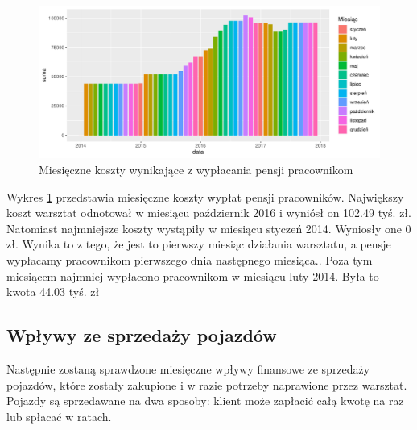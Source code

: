 \documentclass{article}\usepackage[]{graphicx}\usepackage[]{xcolor}
\makeatletter
\def\maxwidth{ %
  \ifdim\Gin@nat@width>\linewidth
    \linewidth
  \else
    \Gin@nat@width
  \fi
}
\newenvironment{knitrout}{}{} %
\makeatother
\begin{document}
\begin{knitrout}
\color{fgcolor}\begin{figure}[H]

{\centering \includegraphics[width=\maxwidth]{figure/fig_pracownicy-1} 

}

\caption[Miesięczne koszty wynikające z wypłacania pensji pracownikom]{Miesięczne koszty wynikające z wypłacania pensji pracownikom}\label{fig:fig_pracownicy}
\end{figure}

\end{knitrout}

Wykres \ref{fig:fig_pracownicy} przedstawia miesięczne koszty wypłat pensji pracowników. Największy koszt warsztat odnotował w miesiącu październik 2016 i wyniósł on 102.49 tyś. zł. 
Natomiast najmniejsze koszty wystąpiły w miesiącu styczeń 2014. Wyniosły one 0 zł. Wynika to z tego, że jest to pierwszy miesiąc działania warsztatu, a pensje wypłacamy pracownikom pierwszego dnia następnego miesiąca.. Poza tym miesiącem najmniej wypłacono pracownikom w miesiącu luty 2014. Była to kwota 44.03 tyś. zł

\subsection{Wpływy ze sprzedaży pojazdów}

Następnie zostaną sprawdzone miesięczne wpływy finansowe ze sprzedaży pojazdów, które zostały zakupione i w razie potrzeby naprawione przez warsztat. Pojazdy są sprzedawane na dwa sposoby: klient może zapłacić całą kwotę na raz lub spłacać w ratach.
\end{document}
